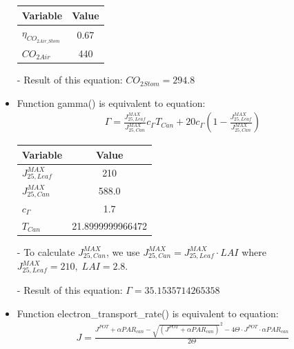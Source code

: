 \documentclass[a4paper]{article}
\begin{document}
\begin{itemize}
        \begin{table}[H]
          \centering
          \begin{tabular}{@{}lS@{}}
            \toprule
            \textbf{Variable}          & \textbf{Value} \\
            \midrule
            \(\eta_{CO_{2Air\_Stom}}\) & 0.67           \\
            \(CO_{2Air}\)              & 440            \\
            \bottomrule
          \end{tabular}
        \end{table}

  \item[-] Result of this equation: \( CO_{2Stom} = 294.8 \)

  \item Function gamma() is equivalent to equation:
        \begin{align*}
          \Gamma = \frac{J^{MAX}_{25,Leaf}}{J^{MAX}_{25,Can}}c_{\Gamma} T_{Can} + 20 c_{\Gamma} \left(1-\frac{J^{MAX}_{25,Leaf}}{J^{MAX}_{25,Can}}\right)
        \end{align*}

        \begin{table}[H]
          \centering
          \begin{tabular}{@{}lS[table-format=3.13]@{}}
            \toprule
            \textbf{Variable}     & \textbf{Value}   \\
            \midrule
            \(J^{MAX}_{25,Leaf}\) & 210              \\
            \(J^{MAX}_{25,Can}\)  & 588.0            \\
            \(c_{\Gamma}\)        & 1.7              \\
            \(T_{Can}\)           & 21.8999999966472 \\
            \bottomrule
          \end{tabular}
        \end{table}

  \item[-] To calculate \(J^{MAX}_{25,Can}\), we use \(J^{MAX}_{25,Can} = J^{MAX}_{25,Leaf} \cdot LAI\) where \(J^{MAX}_{25,Leaf} = 210,\; LAI = 2.8\).
  \item[-] Result of this equation: \(\Gamma = 35.1535714265358\)

  \item Function electron\_transport\_rate() is equivalent to equation:
        \begin{align*}
          J = \frac{J^{POT} + \alpha PAR_{can} - {\sqrt{(J^{POT} + \alpha PAR_{can})}^2 - 4\Theta\cdot J^{POT}\cdot \alpha PAR_{can}}}{2 \Theta}
        \end{align*}


\end{itemize}
\end{document}
